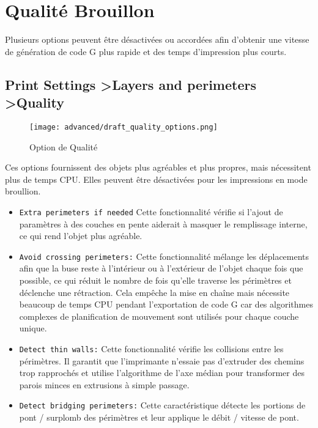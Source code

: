 \section{Qualit\'e Brouillon}

Plusieurs options peuvent être désactivées ou accordées afin d'obtenir une vitesse de génération de code G plus rapide et des temps d'impression plus courts.

\subsection{Print Settings \textgreater Layers and perimeters \textgreater Quality}

\begin{figure}[H]
\centering
\texttt{[image: advanced/draft\_quality\_options.png]}
\caption{Option de Qualit\'e}
\label{fig:draft_quality}
\end{figure}

Ces options fournissent des objets plus agréables et plus propres, mais nécessitent plus de temps CPU. Elles peuvent être désactivées pour les impressions en mode broullion.

\begin{itemize}
\item \texttt{Extra perimeters if needed} Cette fonctionnalité vérifie si l'ajout de paramètres à des couches en pente aiderait à masquer le remplissage interne, ce qui rend l'objet plus agréable.
\item \texttt{Avoid crossing perimeters:} Cette fonctionnalité mélange les déplacements afin que la buse reste à l'intérieur ou à l'extérieur de l'objet chaque fois que possible, ce qui réduit le nombre de fois qu'elle traverse les périmètres et déclenche une rétraction. Cela empêche la mise en chaîne mais nécessite beaucoup de temps CPU pendant l'exportation de code G car des algorithmes complexes de planification de mouvement sont utilisés pour chaque couche unique.
\item \texttt{Detect thin walls:} Cette fonctionnalité vérifie les collisions entre les périmètres. Il garantit que l'imprimante n'essaie pas d'extruder des chemins trop rapprochés et utilise l'algorithme de l'axe médian pour transformer des parois minces en extrusions à simple passage.
\item \texttt{Detect bridging perimeters:} Cette caractéristique détecte les portions de pont / surplomb des périmètres et leur applique le débit / vitesse de pont.
\end{itemize}

